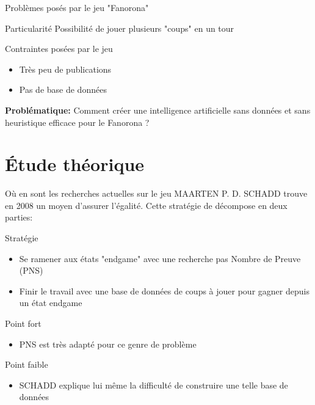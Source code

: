\documentclass{beamer}
\begin{document}
\begin{frame}{Problèmes posés par le jeu "Fanorona"}
\begin{block}{Particularité}
Possibilité de jouer plusieurs "coups" en un tour
\end{block}
\begin{block}{Contraintes posées par le jeu}
\begin{itemize}
    \item Très peu de publications
    \item Pas de base de données
\end{itemize}
\end{block}
\textbf{Problématique:} Comment créer une intelligence artificielle sans données et sans heuristique efficace pour le Fanorona ?
\end{frame}

\section{Étude théorique}

\begin{frame}{Où en sont les recherches actuelles sur le jeu}
    MAARTEN P. D. SCHADD trouve en 2008 un moyen d'assurer l'égalité. Cette stratégie de décompose en deux parties:
    \begin{block}{Stratégie}
        \begin{itemize}
            \item Se ramener aux états "endgame" avec une recherche pas Nombre de Preuve (PNS)
            \item Finir le travail avec une base de données de coups à jouer pour gagner depuis un état endgame
        \end{itemize}
    \end{block}
    \begin{block}{Point fort}
        \begin{itemize}
            \item PNS est très adapté pour ce genre de problème
        \end{itemize}
    \end{block}
    \begin{block}{Point faible}
        \begin{itemize}
            \item SCHADD explique lui même la difficulté de construire une telle base de données
        \end{itemize}
    \end{block}
\end{frame}
\end{document}
